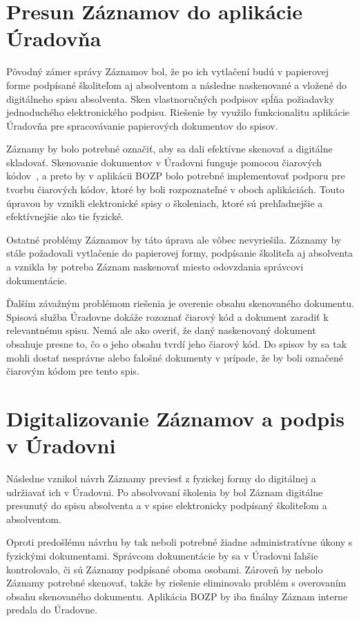 \documentclass[
  digital,     %
  oneside,     %
  nosansbold,  %
  nocolorbold, %
  lof,         %
  nolot,         %
]{fithesis4}
\begin{document}
\section{Presun Záznamov do aplikácie Úradovňa}
Pôvodný zámer správy Záznamov bol, že po ich vytlačení budú v papierovej forme podpísané školiteľom aj absolventom a následne naskenované a vložené do digitálneho spisu absolventa. Sken vlastnoručných podpisov spĺňa požiadavky jednoduchého elektronického podpisu. Riešenie by využilo funkcionalitu aplikácie Úradovňa pre spracovávanie papierových dokumentov do spisov. 

Záznamy by bolo potrebné označiť, aby sa dali efektívne skenovať a digitálne skladovať. Skenovanie dokumentov v Úradovni funguje pomocou čiarových kódov~\cite{uradovna2024}, a preto by v aplikácii BOZP bolo potrebné implementovať podporu pre tvorbu čiarových kódov, ktoré by boli rozpoznateľné v oboch aplikáciách. Touto úpravou by vznikli elektronické spisy o školeniach, ktoré sú prehľadnejšie a efektívnejšie ako tie fyzické.

Ostatné problémy Záznamov by táto úprava ale vôbec nevyriešila. Záznamy by stále požadovali vytlačenie do papierovej formy, podpísanie školiteľa aj absolventa a vznikla by potreba Záznam naskenovať miesto odovzdania správcovi dokumentácie. 

Ďalším závažným problémom riešenia je overenie obsahu skenovaného dokumentu. Spisová služba Úradovne dokáže rozoznať čiarový kód a dokument zaradiť k relevantnému spisu. Nemá ale ako overiť, že daný naskenovaný dokument obsahuje presne to, čo o jeho obsahu tvrdí jeho čiarový kód. Do spisov by sa tak mohli dostať nesprávne alebo falošné dokumenty v prípade, že by boli označené čiarovým kódom pre tento spis.

\section{Digitalizovanie Záznamov a podpis v Úradovni}
Následne vznikol návrh Záznamy previesť z fyzickej formy do digitálnej a udržiavať ich v Úradovni. Po absolvovaní školenia by bol Záznam digitálne presunutý do spisu absolventa a v spise elektronicky podpísaný školiteľom a absolventom.

Oproti predošlému návrhu by tak neboli potrebné žiadne administratívne úkony s fyzickými dokumentami. Správcom dokumentácie by sa v Úradovni ľahšie kontrolovalo, či sú Záznamy podpísané oboma osobami. Zároveň by nebolo Záznamy potrebné skenovať, takže by riešenie eliminovalo problém s overovaním obsahu skenovaného dokumentu. Aplikácia BOZP by iba finálny Záznam interne predala do Úradovne.
\end{document}
